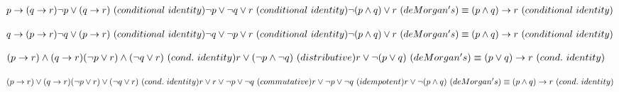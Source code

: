 \documentclass[]{exam}
\begin{document}
\begin{questions}
      \begin{solution}
        \begin{enumerate}
          \begin{minipage}{.45\textwidth}
            \item
              $p \rightarrow (q \rightarrow r)\\
               \lnot p \lor (q \rightarrow r)~(conditional~identity)\\
               \lnot p \lor \lnot q \lor r~(conditional~identity)\\
               \lnot (p \land q) \lor r~(deMorgan's)\\
               \equiv (p \land q) \rightarrow r~(conditional~identity)$
          \end{minipage}
          \begin{minipage}{.45\textwidth}
            \item
              $q \rightarrow (p \rightarrow r)\\
               \lnot q \lor (p \rightarrow r)~(conditional~identity)\\
               \lnot q \lor \lnot p \lor r~(conditional~identity)\\
               \lnot (p \land q) \lor r~(deMorgan's)\\
               \equiv (p \land q) \rightarrow r~(conditional~identity)$
          \end{minipage}

          \begin{minipage}{.45\textwidth}
            \item
              $(p \rightarrow r) \land (q \rightarrow r)\\
               (\lnot p \lor r) \land (\lnot q \lor r)~(cond.~identity)\\
               r \lor (\lnot p \land \lnot q)~(distributive)\\
               r \lor \lnot(p \lor q)~(deMorgan's)\\
               \equiv (p \lor q) \rightarrow r~(cond.~identity)$
          \end{minipage}
          \begin{minipage}{.45\textwidth}
            \item
              $(p \rightarrow r) \lor (q \rightarrow r)\\
               (\lnot p \lor r) \lor (\lnot q \lor r)~(cond.~identity)\\
               r \lor r \lor \lnot p \lor \lnot q~(commutative)\\
               r \lor \lnot p \lor \lnot q~(idempotent)\\
               r \lor \lnot(p \land q)~(deMorgan's)\\
               \equiv (p \land q) \rightarrow r~(cond.~identity)$
          \end{minipage}
        \end{enumerate}
      \end{solution}


\end{questions}
\end{document}

